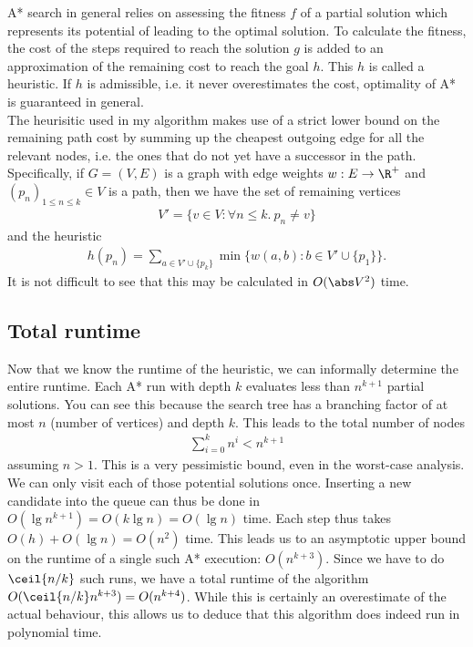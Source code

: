 \documentclass{article}
\begin{document}
A* search in general relies on assessing the fitness $f$ of a partial solution 
which represents its potential of leading to the optimal solution. To calculate the
fitness, the cost of the steps required to reach the solution $g$ is added to an approximation
of the remaining cost to reach the goal $h$. This $h$ is called a heuristic.
If $h$ is admissible, i.e. it never overestimates the cost, optimality of A* is
guaranteed in general.\\
The heurisitic used in my algorithm makes use of a strict lower bound on the remaining
path cost by summing up the cheapest outgoing edge for all the relevant nodes, i.e.
the ones that do not yet have a successor in the path. Specifically, if $G=(V,E)$ is
a graph with edge weights $w:E\to\R^+$
 and $(p_n)_{1\leq n\leq k}\in V$ is a path, then we have the set of remaining vertices
\begin{align*}
    V'=\{v\in V : \forall n \leq k.\: p_n \not= v\}
\end{align*}
and the heuristic
\begin{align*}
    h(p_n) = \sum_{a\in V'\cup\{p_k\}} \min\{w(a, b) : b\in V'\cup\{p_1\}\}.
\end{align*}
It is not difficult to see that this may be calculated in $O(\abs V^2)$ time. 

\subsection{Total runtime}

Now that we know the runtime of the heuristic, we can informally determine the entire
runtime. Each A* run with depth $k$ evaluates less than $n^{k+1}$ partial solutions. 
You can see this because the search tree has a branching factor of at most $n$ (number
of vertices) and depth $k$. This leads to the total number of nodes
\begin{align*}
    \sum_{i=0}^k n^i < n^{k+1}
\end{align*}
assuming $n>1$. This is a very pessimistic bound, even in the worst-case
analysis. We can only visit each of those potential solutions once.
Inserting a new candidate into the queue can thus be done in $O(\lg n^{k+1})
= O(k\lg n)=O(\lg n)$ time. Each step thus takes $O(h)+O(\lg n)=O(n^2)$ time.
This leads us to an asymptotic upper bound on the runtime of a single
such A* execution: $O(n^{k+3})$. Since we have to do $\ceil{n/k}$ such
runs, we have a total runtime of the algorithm $O(\ceil{n/k}n^{k+3})=
O(n^{k+4})$. While this is certainly an overestimate of the actual behaviour,
this allows us to deduce that this algorithm does indeed run in
polynomial time.
\end{document}
